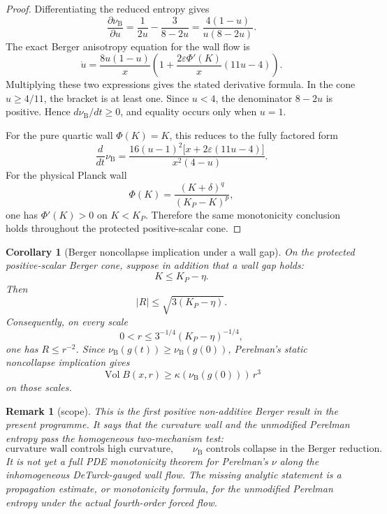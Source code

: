 \documentclass[11pt]{amsart}
\newtheorem{corollary}{Corollary}
\newtheorem{remark}{Remark}
\newcommand{\KP}{K_{\!P}}
\newcommand{\Vol}{\operatorname{Vol}}
\begin{document}
\begin{proof}
Differentiating the reduced entropy gives
\[
        \frac{\partial \nu_{\mathrm B}}{\partial u}
        =
        \frac{1}{2u}-\frac{3}{8-2u}
        =
        \frac{4(1-u)}{u(8-2u)}.
\]
The exact Berger anisotropy equation for the wall flow is
\[
        \dot u
        =
        \frac{8u(1-u)}{x}
        \left(
        1+\frac{2\varepsilon\Phi'(K)}{x}(11u-4)
        \right).
\]
Multiplying these two expressions gives the stated derivative formula.  In the
cone \(u\ge4/11\), the bracket is at least one.  Since \(u<4\), the denominator
\(8-2u\) is positive.  Hence \(d\nu_{\mathrm B}/dt\ge0\), and equality occurs
only when \(u=1\).

For the pure quartic wall \(\Phi(K)=K\), this reduces to the fully factored
form
\[
        \frac{d}{dt}\nu_{\mathrm B}
        =
        \frac{16(u-1)^2\bigl[x+2\varepsilon(11u-4)\bigr]}
        {x^2(4-u)} .
\]
For the physical Planck wall
\[
        \Phi(K)=\frac{(K+\delta)^q}{(\KP-K)^p},
\]
one has \(\Phi'(K)>0\) on \(K<\KP\).  Therefore the same monotonicity conclusion
holds throughout the protected positive-scalar cone.
\end{proof}

\begin{corollary}[Berger noncollapse implication under a wall gap]
On the protected positive-scalar Berger cone, suppose in addition that a wall
gap holds:
\[
        K\le \KP-\eta.
\]
Then
\[
        |R|\le \sqrt{3(\KP-\eta)}.
\]
Consequently, on every scale
\[
        0<r\le 3^{-1/4}(\KP-\eta)^{-1/4},
\]
one has \(R\le r^{-2}\).  Since \(\nu_{\mathrm B}(g(t))\ge\nu_{\mathrm B}(g(0))\),
Perelman's static noncollapse implication gives
\[
        \Vol B(x,r)\ge \kappa(\nu_{\mathrm B}(g(0)))\,r^3
\]
on those scales.
\end{corollary}

\begin{remark}[scope]
This is the first positive non-additive Berger result in the present
programme.  It says that the curvature wall and the unmodified Perelman
entropy pass the homogeneous two-mechanism test:
\[
        \text{curvature wall controls high curvature,}
        \qquad
        \nu_{\mathrm B}\text{ controls collapse in the Berger reduction.}
\]
It is not yet a full PDE monotonicity theorem for Perelman's \(\nu\) along the
inhomogeneous DeTurck-gauged wall flow.  The missing analytic statement is a
propagation estimate, or monotonicity formula, for the unmodified Perelman
entropy under the actual fourth-order forced flow.
\end{remark}
\end{document}
